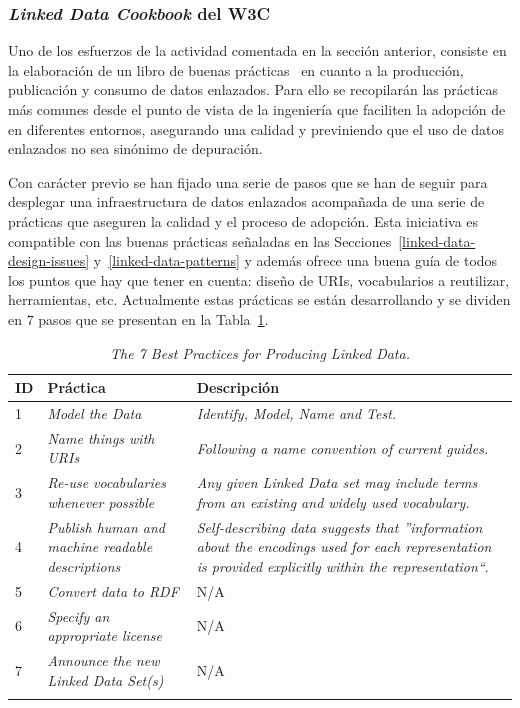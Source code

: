 \subsubsection{\textit{Linked Data Cookbook} del W3C}\label{linked-data-cookbook}
Uno de los esfuerzos de la actividad comentada en la sección anterior, consiste
en la elaboración de un libro de buenas prácticas~\cite{linked-data-cookbook} en cuanto a la producción, publicación y consumo de 
datos enlazados. Para ello se recopilarán las prácticas más comunes
desde el punto de vista de la ingeniería que faciliten la adopción de \linkeddata en 
diferentes entornos, asegurando una calidad y previniendo que el uso de datos enlazados
no sea sinónimo de depuración.

Con carácter previo se han fijado una serie de pasos que se han de seguir para desplegar
una infraestructura de datos enlazados acompañada de una serie de prácticas que aseguren
la calidad y el proceso de adopción. Esta iniciativa es compatible con las buenas prácticas
señaladas en las Secciones~\ref{linked-data-design-issues} y~\ref{linked-data-patterns} y además
ofrece una buena guía de todos los puntos que hay que tener en cuenta: diseño de URIs, vocabularios
a reutilizar, herramientas, etc. Actualmente estas prácticas se están desarrollando y 
se dividen en $7$ pasos que se presentan en la Tabla~\ref{table:linkeddata-practices}.


\begin{longtable}[c]{|l|p{6.5cm}|p{7.5cm}|} 

\hline

  \textbf{ID} & \textbf{Práctica} & \textbf{Descripción} \\\hline

\endhead
  1 &  \textit{Model the Data} & \textit{Identify, Model, Name and Test.}\\ \hline
  2 &  \textit{Name things with \gls{URI}s} & \textit{Following a name convention of current guides.} \\ \hline
  3 &  \textit{Re-use vocabularies whenever possible} &   \textit{Any given Linked Data set may include terms from an existing and widely used vocabulary.} \\ \hline
  4 &  \textit{Publish human and machine readable descriptions} & \textit{Self-describing data suggests that ''information about the encodings used for each representation is provided explicitly within the representation``}.  \\ \hline
  5 &  \textit{Convert data to \gls{RDF}} & N/A \\ \hline
  6 &  \textit{Specify an appropriate license} & N/A \\ \hline
  7 &  \textit{Announce the new Linked Data Set(s) } &  N/A  \\ \hline    
 
\hline
\caption{\textit{The 7 Best Practices for Producing Linked Data.}}\label{table:linkeddata-practices}\\    
\end{longtable}


